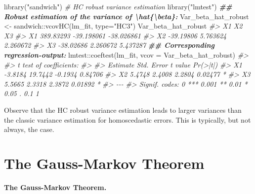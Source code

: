 \documentclass[
  14pt,
]{memoir}
\newenvironment{Shaded}{\begin{snugshade}}{\end{snugshade}}
\newcommand{\AttributeTok}[1]{\textcolor[rgb]{0.77,0.63,0.00}{#1}}
\newcommand{\CommentTok}[1]{\textcolor[rgb]{0.56,0.35,0.01}{\textit{#1}}}
\newcommand{\DocumentationTok}[1]{\textcolor[rgb]{0.56,0.35,0.01}{\textbf{\textit{#1}}}}
\newcommand{\FunctionTok}[1]{\textcolor[rgb]{0.00,0.00,0.00}{#1}}
\newcommand{\NormalTok}[1]{#1}
\newcommand{\OtherTok}[1]{\textcolor[rgb]{0.56,0.35,0.01}{#1}}
\newcommand{\SpecialCharTok}[1]{\textcolor[rgb]{0.00,0.00,0.00}{#1}}
\newcommand{\StringTok}[1]{\textcolor[rgb]{0.31,0.60,0.02}{#1}}
\begin{document}
\begin{Shaded}
\begin{Highlighting}[]
\FunctionTok{library}\NormalTok{(}\StringTok{"sandwich"}\NormalTok{) }\CommentTok{\# HC robust variance estimation }
\FunctionTok{library}\NormalTok{(}\StringTok{"lmtest"}\NormalTok{)}
\DocumentationTok{\#\# Robust estimation of the variance of \textbackslash{}hat\{\textbackslash{}beta\}:}
\NormalTok{Var\_beta\_hat\_robust }\OtherTok{\textless{}{-}}\NormalTok{ sandwich}\SpecialCharTok{::}\FunctionTok{vcovHC}\NormalTok{(lm\_fit, }\AttributeTok{type=}\StringTok{"HC3"}\NormalTok{)}
\NormalTok{Var\_beta\_hat\_robust }
\CommentTok{\#\textgreater{}           X1         X2         X3}
\CommentTok{\#\textgreater{} X1 389.83293 {-}39.198061 {-}38.026861}
\CommentTok{\#\textgreater{} X2 {-}39.19806   5.763624   2.260672}
\CommentTok{\#\textgreater{} X3 {-}38.02686   2.260672   5.437287}
\DocumentationTok{\#\# Corresponding regression{-}output:}
\NormalTok{lmtest}\SpecialCharTok{::}\FunctionTok{coeftest}\NormalTok{(lm\_fit, }\AttributeTok{vcov =}\NormalTok{ Var\_beta\_hat\_robust)}
\CommentTok{\#\textgreater{} }
\CommentTok{\#\textgreater{} t test of coefficients:}
\CommentTok{\#\textgreater{} }
\CommentTok{\#\textgreater{}    Estimate Std. Error t value Pr(\textgreater{}|t|)  }
\CommentTok{\#\textgreater{} X1  {-}3.8184    19.7442 {-}0.1934  0.84706  }
\CommentTok{\#\textgreater{} X2   5.4748     2.4008  2.2804  0.02477 *}
\CommentTok{\#\textgreater{} X3   5.5665     2.3318  2.3872  0.01892 *}
\CommentTok{\#\textgreater{} {-}{-}{-}}
\CommentTok{\#\textgreater{} Signif. codes:  0 \textquotesingle{}***\textquotesingle{} 0.001 \textquotesingle{}**\textquotesingle{} 0.01 \textquotesingle{}*\textquotesingle{} 0.05 \textquotesingle{}.\textquotesingle{} 0.1 \textquotesingle{} \textquotesingle{} 1}
\end{Highlighting}
\end{Shaded}

Observe that the HC robust variance estimation leads to larger variances than the classic variance estimation for homoscedastic errors. This is typically, but not always, the case.

\hypertarget{the-gauss-markov-theorem}{%
\section{The Gauss-Markov Theorem}\label{the-gauss-markov-theorem}}

\paragraph*{The Gauss-Markov Theorem.}
\end{document}
